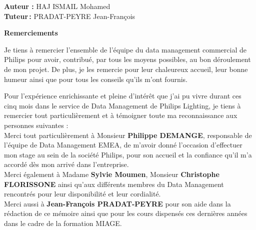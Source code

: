 \documentclass[12pt,a4paper]{article}
\begin{document}
\begin{titlepage}
\begin{center}
\end{center}

\begin{flushleft}
 \Large \textbf{Auteur :} 
\textsc{HAJ ISMAIL} Mohamed \\


\emph \large \textbf{\color{segmicolor}Tuteur\,:} 
 \textsc{PRADAT-PEYRE} Jean-François
 
\end{flushleft}

\end{titlepage}
 
\newpage
\thispagestyle{empty}
\strut 

\newpage
\setcounter{page}{3}
\textbf{\huge Remerciements}



\vspace{1.5cm}

\hspace{0.5cm} 

Je tiens à remercier l’ensemble de l’équipe du data management commercial de Philips pour avoir, contribué, par tous les moyens possibles, au bon déroulement de mon projet. De plus, je les remercie pour leur chaleureux accueil, leur bonne humeur ainsi que pour tous les conseils qu’ils m’ont fournis.

Pour l’expérience enrichissante et pleine d’intérêt que j’ai pu vivre durant ces cinq mois dans le service de Data Management de Philips Lighting, je tiens à remercier tout particulièrement et à témoigner toute ma reconnaissance aux personnes suivantes :\\

Merci tout particulièrement à Monsieur \textbf{Philippe DEMANGE}, responsable de l’équipe de Data Management EMEA, de m’avoir donné l’occasion d’effectuer mon stage au sein de la société Philips, pour son accueil et la confiance qu’il m’a accordé dès mon arrivé dans l’entreprise.\\

Merci également à Madame \textbf{Sylvie Moumen}, Monsieur \textbf{Christophe FLORISSONE} ainsi qu'aux différents membres du Data Management rencontrés pour leur disponibilité et leur cordialité. \\

Merci aussi à \textbf{Jean-François PRADAT-PEYRE} pour son aide dans la rédaction de ce mémoire ainsi que pour les cours dispensés ces dernières années dans le cadre de la formation MIAGE.\\
\end{document}
